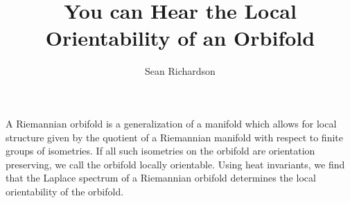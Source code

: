\documentclass[12]{amsart}
\begin{document}
\title{You can Hear the Local Orientability of an Orbifold}
\author{Sean Richardson}
\maketitle

A Riemannian orbifold is a generalization of a manifold which allows for local structure given by the quotient of a Riemannian manifold with respect to finite groups of isometries. If all such isometries on the orbifold are orientation preserving, we call the orbifold locally orientable. Using heat invariants, we find that the Laplace spectrum of a Riemannian orbifold determines the local orientability of the orbifold.
\end{document}
